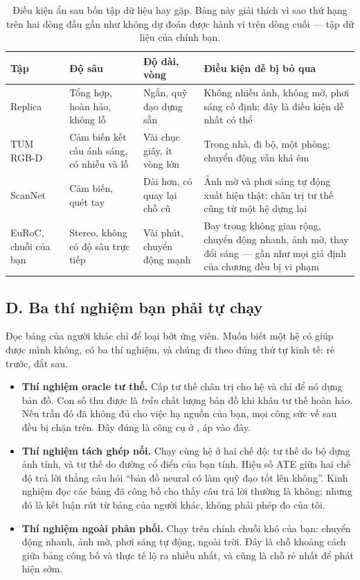 \documentclass[../../deep_learning.tex]{subfiles}
\begin{document}
\begin{table}[H]\centering\footnotesize
\caption{Điều kiện ẩn sau bốn tập dữ liệu hay gặp. Bảng này giải thích vì sao thứ hạng trên hai dòng đầu gần như không dự đoán được hành vi trên dòng cuối --- tập dữ liệu của chính bạn.}
\label{tab:f32-datasets}
\begin{tabularx}{\linewidth}{@{}L{2.2cm}L{2.5cm}L{2.2cm}Y@{}}
\toprule
\textbf{Tập} & \textbf{Độ sâu} & \textbf{Độ dài, vòng} & \textbf{Điều kiện dễ bị bỏ qua}\\
\midrule
Replica & Tổng hợp, hoàn hảo, không lỗ & Ngắn, quỹ đạo dựng sẵn & Không nhiễu ảnh, không mờ, phơi sáng cố định; đây là điều kiện dễ nhất có thể\\
TUM RGB-D & Cảm biến kết cấu ánh sáng, có nhiễu và lỗ & Vài chục giây, ít vòng lớn & Trong nhà, đi bộ, một phòng; chuyển động vẫn khá êm\\
ScanNet & Cảm biến, quét tay & Dài hơn, có quay lại chỗ cũ & Ảnh mờ và phơi sáng tự động xuất hiện thật; chân trị tư thế cũng từ một hệ dựng lại\\
EuRoC, chuỗi của bạn & Stereo, không có độ sâu trực tiếp & Vài phút, chuyển động mạnh & Bay trong không gian rộng, chuyển động nhanh, ảnh mờ, thay đổi sáng --- gần như mọi giả định của chương đều bị vi phạm\\
\bottomrule
\end{tabularx}
\end{table}

\subsection{D. Ba thí nghiệm bạn phải tự chạy}
Đọc bảng của người khác chỉ để loại bớt ứng viên. Muốn biết một hệ có giúp được mình không, có ba thí nghiệm, và chúng đi theo đúng thứ tự kinh tế: rẻ trước, đắt sau.

\begin{itemize}
\item \textbf{Thí nghiệm oracle tư thế.} Cấp tư thế chân trị cho hệ và chỉ để nó dựng bản đồ. Con số thu được là \emph{trần} chất lượng bản đồ khi khâu tư thế hoàn hảo. Nếu trần đó đã không đủ cho việc hạ nguồn của bạn, mọi công sức về sau đều bị chặn trên. Đây đúng là công cụ ở , áp vào đây.
\item \textbf{Thí nghiệm tách ghép nối.} Chạy cùng hệ ở hai chế độ: tư thế do bộ dựng ảnh tính, và tư thế do đường cổ điển của bạn tính. Hiệu số ATE giữa hai chế độ trả lời thẳng câu hỏi ``bản đồ neural có làm quỹ đạo tốt lên không''. Kinh nghiệm đọc các bảng đã công bố cho thấy câu trả lời thường là không; nhưng đó là kết luận rút từ bảng của người khác, không phải phép đo của tôi.
\item \textbf{Thí nghiệm ngoài phân phối.} Chạy trên chính chuỗi khó của bạn: chuyển động nhanh, ảnh mờ, phơi sáng tự động, ngoài trời. Đây là chỗ khoảng cách giữa bảng công bố và thực tế lộ ra nhiều nhất, và cũng là chỗ rẻ nhất để phát hiện sớm.
\end{itemize}
\end{document}
